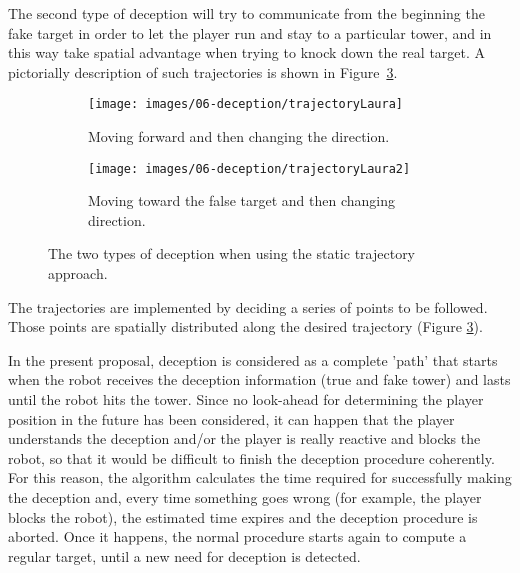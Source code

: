 The second type of deception will try to communicate from the beginning the fake target in order to let the player run and stay to a particular tower, and in this way take spatial advantage when trying to knock down the real target. A pictorially description of such trajectories is shown in Figure~\ref{fig::trajectoryStatic}.

\begin{figure}[h]
    \centering
    \begin{subfigure}[t]{0.45\columnwidth}
        \centering
        \texttt{[image: images/06-deception/trajectoryLaura]}
        \caption{Moving forward and then changing the direction.}
        \label{fig:1}
    \end{subfigure}
    \hspace{0.01\columnwidth}
    \begin{subfigure}[t]{0.45\columnwidth}
        \centering
        \texttt{[image: images/06-deception/trajectoryLaura2]}
        \caption{Moving toward the false target and then changing direction.}
        \label{fig:2}
    \end{subfigure}
    \caption{The two types of deception when using the static trajectory approach.}
    \label{fig::trajectoryStatic}
\end{figure}

The trajectories are implemented by deciding a series of points to be followed. Those points are spatially distributed along the desired trajectory (Figure \ref{fig::trajectoryStatic}).

In the present proposal, deception is considered as a complete 'path' that starts when the robot receives the deception information (true and fake tower) and lasts until the robot hits the tower. Since no look-ahead for determining the player position in the future has been considered, it can happen that the player understands the deception and/or the player is really reactive and blocks the robot, so that it would be difficult to finish the deception procedure coherently.
For this reason, the algorithm calculates the time required for successfully making the deception and, every time something goes wrong (for example, the player blocks the robot), the estimated time expires and the deception procedure is aborted. Once it happens, the normal procedure starts again to compute a regular target, until a new need for deception is detected.

